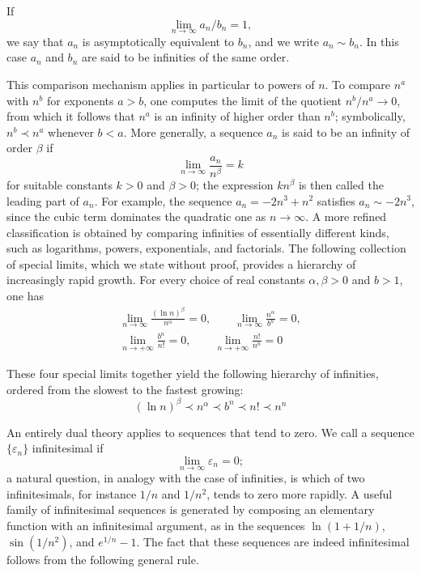 \begin{definition}
If \[
\lim_{n \to \infty} a_n / b_n = 1,
\] we say that $a_n$ is asymptotically equivalent to $b_n$, and we write
$a_n \sim b_n$. In this case $a_n$ and $b_n$ are said to be infinities of the same order.
\end{definition}

This comparison mechanism applies in particular to powers of $n$. To compare $n^a$ with $n^b$ for exponents
$a > b$, one computes the limit of the quotient $n^b / n^a \to 0$, from which it follows that $n^a$ is an
infinity of higher order than $n^b$; symbolically, $n^b \prec n^a$ whenever $b < a$. More generally, a sequence
$a_n$ is said to be an infinity of order $\beta$ if \[
\lim_{n \to \infty} \frac{a_n}{n^\beta} = k
\] for suitable constants $k > 0$ and $\beta > 0$; the expression $k n^\beta$ is then called the leading part of
$a_n$. For example, the sequence $a_n = -2n^3 + n^2$ satisfies $a_n \sim -2n^3$, since the cubic term dominates
the quadratic one as $n \to \infty$. A more refined classification is obtained by comparing infinities of
essentially different kinds, such as logarithms, powers, exponentials, and factorials. The following collection
of special limits, which we state without proof, provides a hierarchy of increasingly rapid growth. For every
choice of real constants $\alpha, \beta > 0$ and $b > 1$, one has
\[
\begin{gathered}
\lim_{n \to \infty} \frac{(\ln n)^\beta}{n^\alpha} = 0, \qquad
\lim_{n \to \infty} \frac{n^\alpha}{b^n} = 0, \\
\lim_{n \to +\infty} \frac{b^n}{n!} = 0, \qquad
\lim_{n \to +\infty} \frac{n!}{n^n} = 0
\end{gathered}
\]

These four special limits together yield the following hierarchy of infinities, ordered from the slowest to the
fastest growing:
\[
(\ln n)^\beta \prec n^\alpha \prec b^n \prec n! \prec n^n
\]

An entirely dual theory applies to sequences that tend to zero. We call a sequence $\{\varepsilon_n\}$
infinitesimal if \[
\lim_{n \to \infty} \varepsilon_n = 0;
\] a natural question, in analogy with the case of
infinities, is which of two infinitesimals, for instance $1/n$ and $1/n^2$, tends to zero more rapidly. A useful
family of infinitesimal sequences is generated by composing an elementary function with an infinitesimal argument,
as in the sequences $\ln(1 + 1/n)$, $\sin(1/n^2)$, and $e^{1/n} - 1$. The fact that these sequences are indeed
infinitesimal follows from the following general rule.

